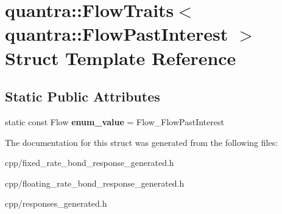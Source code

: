 \hypertarget{structquantra_1_1FlowTraits_3_01quantra_1_1FlowPastInterest_01_4}{}\section{quantra\+:\+:Flow\+Traits$<$ quantra\+:\+:Flow\+Past\+Interest $>$ Struct Template Reference}
\label{structquantra_1_1FlowTraits_3_01quantra_1_1FlowPastInterest_01_4}
\subsection*{Static Public Attributes}
\begin{DoxyCompactItemize}
\item 
\mbox{\label{structquantra_1_1FlowTraits_3_01quantra_1_1FlowPastInterest_01_4_ac9b9108a41cb15b993acbf73f257444a}} 
static const Flow {\bfseries enum\+\_\+value} = Flow\+\_\+\+Flow\+Past\+Interest
\end{DoxyCompactItemize}


The documentation for this struct was generated from the following files\+:\begin{DoxyCompactItemize}
\item 
cpp/fixed\+\_\+rate\+\_\+bond\+\_\+response\+\_\+generated.\+h\item 
cpp/floating\+\_\+rate\+\_\+bond\+\_\+response\+\_\+generated.\+h\item 
cpp/responses\+\_\+generated.\+h\end{DoxyCompactItemize}
